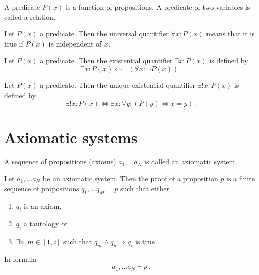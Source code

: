     \begin{definition}
        A predicate $P(x)$ is a function of propositions. A predicate of two variables is called a relation.
    \end{definition}

    \begin{definition}
        Let $P(x)$ a predicate. Then the universal quantifier $\forall x \colon P(x)$ means that it is true if $P(x)$ is independent of $x$.
    \end{definition}

    \begin{definition}
        Let $P(x)$ a predicate. Then the existential quantifier $\exists x \colon P(x)$ is defined by 
        \begin{equation*}
            \exists x \colon P(x) \Leftrightarrow \lnot (\forall x \colon \lnot P(x)) ~.
        \end{equation*}
    \end{definition}

    \begin{definition}
        Let $P(x)$ a predicate. Then the unique existential quantifier $\exists ! x \colon P(x)$ is defined by
        \begin{equation*}
            \exists ! x \colon P(x) \Leftrightarrow \exists x \colon \forall y \colon ( P(y) \Leftrightarrow x = y ) ~.
        \end{equation*}
    \end{definition}

\section{Axiomatic systems}

    \begin{definition}
        A sequence of propositions (axioms) $a_1, \ldots a_N$ is called an axiomatic system.
    \end{definition}

    \begin{definition}
        Let $a_1, \ldots a_N$ be an axiomatic system. Then the proof of a proposition $p$ is a finite sequence of propositions $q_1, \ldots q_M=p$ such that either 
        \begin{enumerate}\label{proof}
            \item $q_i$ is an axiom, 
            \item $q_i$ a tautology or 
            \item $\exists n, m \in [1, i]$ such that $q_m \land q_n \Rightarrow q_i$ is true.
        \end{enumerate}
        In formula
        \begin{equation*}
            a_1, \ldots a_N \vdash p ~.
        \end{equation*}
    \end{definition}

